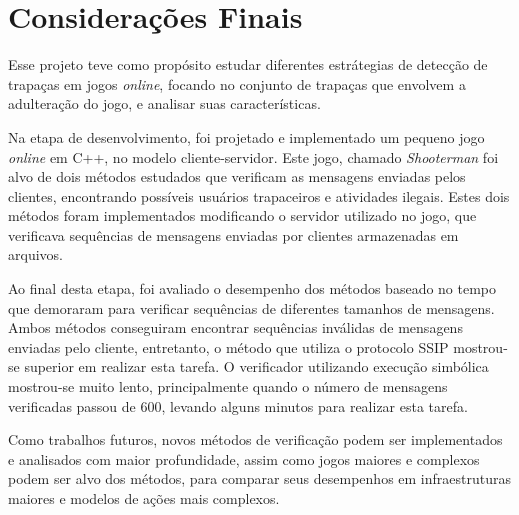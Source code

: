 \chapter{Considerações Finais}
\label{cap:conclusao}

Esse projeto teve como propósito estudar diferentes estrátegias de detecção de trapaças em jogos \textit{online}, focando no conjunto de trapaças que envolvem a adulteração do jogo, e analisar suas características. 


Na etapa de desenvolvimento, foi projetado e implementado um pequeno jogo \textit{online} em C++, no modelo cliente-servidor. Este jogo, chamado \textit{Shooterman} foi alvo de dois métodos estudados que verificam as mensagens enviadas pelos clientes, encontrando possíveis usuários trapaceiros e atividades ilegais. Estes dois métodos foram implementados modificando o servidor utilizado no jogo, que verificava sequências de mensagens enviadas por clientes armazenadas em arquivos.

Ao final desta etapa, foi avaliado o desempenho dos métodos baseado no tempo que demoraram para verificar sequências de diferentes tamanhos de mensagens. Ambos métodos conseguiram encontrar sequências inválidas de mensagens enviadas pelo cliente, entretanto, o método que utiliza o protocolo SSIP mostrou-se superior em realizar esta tarefa. O verificador utilizando execução simbólica mostrou-se muito lento, principalmente quando o número de mensagens verificadas passou de 600, levando alguns minutos para realizar esta tarefa.

Como trabalhos futuros, novos métodos de verificação podem ser implementados e analisados com maior profundidade, assim como jogos maiores e complexos podem ser alvo dos métodos, para comparar seus desempenhos em infraestruturas maiores e modelos de ações mais complexos.